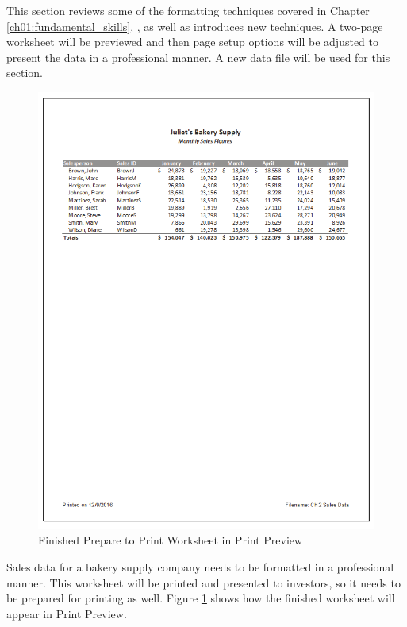 This section reviews some of the formatting techniques covered in Chapter \ref{ch01:fundamental_skills}, , as well as introduces new techniques. A two-page worksheet will be previewed and then page setup options will be adjusted to present the data in a professional manner. A new data file will be used for this section.

\begin{figure}[H]
	\centering
	\includegraphics[width=\maxwidth{.95\linewidth}]{gfx/ch02_fig40}
	\caption{Finished Prepare to Print Worksheet in Print Preview}
	\label{02:fig40}
\end{figure}

Sales data for a bakery supply company needs to be formatted in a professional manner. This worksheet will be printed and presented to investors, so it needs to be prepared for printing as well. Figure \ref{02:fig40} shows how the finished worksheet will appear in Print Preview.

